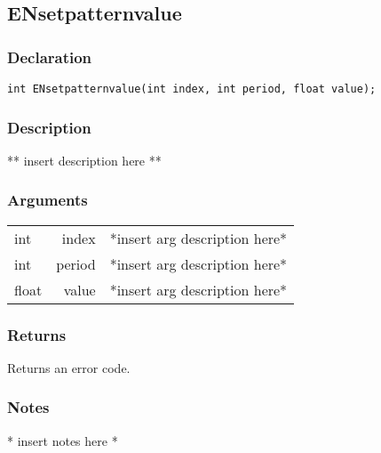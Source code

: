 \subsection{ENsetpatternvalue}
\subsubsection{Declaration}
\begin{lstlisting}
int ENsetpatternvalue(int index, int period, float value);
\end{lstlisting}
\subsubsection{Description}
** insert description here **
\subsubsection{Arguments}
\begin{tabular}{l r p{11cm} }
int&index&*insert arg description here* \\[6pt]
int&period&*insert arg description here* \\[6pt]
float&value&*insert arg description here* \\[6pt]
\end{tabular}
\subsubsection{Returns}
Returns an error code.
\subsubsection{Notes}
* insert notes here *